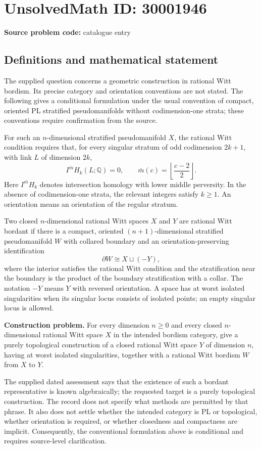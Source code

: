 \documentclass[11pt]{article}
\newcommand{\Q}{\mathbb{Q}}
\begin{document}
\section*{UnsolvedMath ID: 30001946}
\textbf{Source problem code:} catalogue entry
\subsection{Definitions and mathematical statement}
The supplied question concerns a geometric construction in rational Witt bordism. Its precise category and orientation conventions are not stated. The following gives a conditional formulation under the usual convention of compact, oriented PL stratified pseudomanifolds without codimension-one strata; these conventions require confirmation from the source.

For such an \(n\)-dimensional stratified pseudomanifold \(X\), the rational Witt condition requires that, for every singular stratum of odd codimension \(2k+1\), with link \(L\) of dimension \(2k\),
\[
I^{\bar m}H_k(L;\Q)=0,
\qquad \bar m(c)=\left\lfloor\frac{c-2}{2}\right\rfloor.
\]
Here \(I^{\bar m}H_k\) denotes intersection homology with lower middle perversity. In the absence of codimension-one strata, the relevant integers satisfy \(k\geq 1\). An orientation means an orientation of the regular stratum.

Two closed \(n\)-dimensional rational Witt spaces \(X\) and \(Y\) are rational Witt bordant if there is a compact, oriented \((n+1)\)-dimensional stratified pseudomanifold \(W\) with collared boundary and an orientation-preserving identification
\[
\partial W\cong X\sqcup(-Y),
\]
where the interior satisfies the rational Witt condition and the stratification near the boundary is the product of the boundary stratification with a collar. The notation \(-Y\) means \(Y\) with reversed orientation. A space has at worst isolated singularities when its singular locus consists of isolated points; an empty singular locus is allowed.

\textbf{Construction problem.} For every dimension \(n\geq 0\) and every closed \(n\)-dimensional rational Witt space \(X\) in the intended bordism category, give a purely topological construction of a closed rational Witt space \(Y\) of dimension \(n\), having at worst isolated singularities, together with a rational Witt bordism \(W\) from \(X\) to \(Y\).

The supplied dated assessment says that the existence of such a bordant representative is known algebraically; the requested target is a purely topological construction. The record does not specify what methods are permitted by that phrase. It also does not settle whether the intended category is PL or topological, whether orientation is required, or whether closedness and compactness are implicit. Consequently, the conventional formulation above is conditional and requires source-level clarification.
\end{document}
